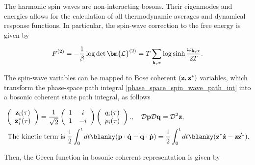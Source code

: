 The harmonic spin waves are non-interacting bosons. Their eigenmodes and energies allows for the calculation of all thermodynamic averages and dynamical response functions. In particular, the spin-wave correction to the free energy is given by 

\begin{equation}
    F^{(2)} = -\frac{1}{\beta} \log \det \bm{\mathcal{L}}^{(2)} = T \sum_{{\bf k}, \alpha} \log \sinh \frac{\omega_{{\bf k}, \alpha}}{2T}. 
\end{equation}

The spin-wave variables can be mapped to Bose coherent $({\bf z}, {\bf z}^{*})$ variables, which transform the phase-space path integral \cref{phase_space_spin_wave_path_int} into a bosonic coherent state path integral, as follows 

\begin{equation}
\begin{split}
    &\left(\begin{array}{c}
         {\bf z}_{i}(\tau)  \\
         {\bf z}^{*}_{i}(\tau) 
    \end{array}\right) = \frac{1}{\sqrt{2}} \left(\begin{array}{cc}
         1 & i \\
         1 & -i 
    \end{array}\right)
    \left(\begin{array}{c}
         q_{i}(\tau)  \\
         p_{i}(\tau) 
    \end{array}\right)., \quad \mathcal{D}{\bf p}\mathcal{D}{\bf q} = \mathcal{D}^2{\bf z}, \\
    &\textnormal{ The kinetic term is } \frac{1}{2} \int_{0}^{t} dt \blanky ({\bf p} \cdot \dot{{\bf q}} - {\bf q} \cdot \dot{{\bf p}}) = \frac{1}{2} \int_{0}^{t} dt \blanky ({\bf z}^{*}\dot{{\bf z}} - {\bf z}\dot{{\bf z}^{*}}).
\end{split}
\end{equation}

Then, the Green function in bosonic coherent representation is given by 

